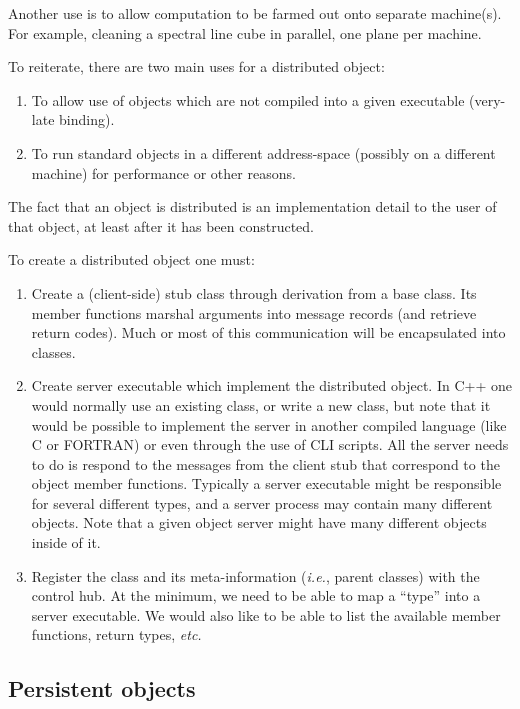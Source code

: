 Another use is to allow computation to be farmed out onto separate
machine(s). For example, cleaning a spectral line cube in parallel,
one plane per machine.

To reiterate, there are two main uses for a distributed object:
\begin{enumerate}
        \item To allow use of objects which are not compiled into a
        given executable (very-late binding).
        \item To run standard objects in a different address-space
        (possibly on a different machine) for performance or other
        reasons.
\end{enumerate}

The fact that an object is distributed is an implementation detail to
the user of that object, at least after it has been constructed.

To create a distributed object one must:
\begin{enumerate}
\item
    Create a (client-side) stub class through derivation from a base
    class. Its member functions marshal arguments into message
    records (and retrieve return codes). Much or most of this
    communication will be encapsulated into classes.
\item
    Create server executable which implement the distributed object.
    In C++ one would normally use an existing class, or write a
    new class, but note that it would be possible to implement the
    server in another compiled language (like C or FORTRAN) or even
    through the use of CLI scripts. All the server needs to do is respond
    to the messages from the client stub that correspond to the object
    member functions.  Typically a server executable might be
    responsible for several different types, and a server process may
    contain many different objects. Note that a given object server
    might have many different objects inside of it.
\item
    Register the class and its meta-information ({\em i.e.}, parent classes)
    with the control hub. At the minimum, we need to be able to map a
    ``type'' into a server executable. We would also like to be able
    to list the available member functions, return types, {\em etc.}
\end{enumerate}

\subsection{Persistent objects}


